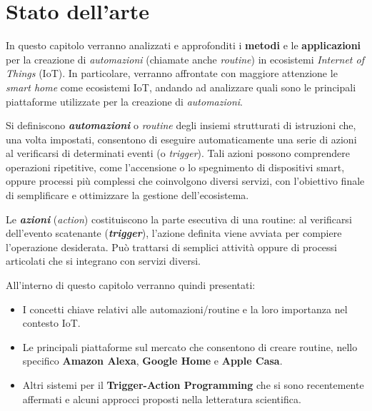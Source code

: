 
\chapter{Stato dell'arte}
In questo capitolo verranno analizzati e approfonditi i \textbf{metodi} e le \textbf{applicazioni} per la creazione di \emph{automazioni} (chiamate anche \emph{routine}) in ecosistemi \emph{Internet of Things} (IoT).
In particolare, verranno affrontate con maggiore attenzione le \emph{smart home} come ecosistemi IoT, andando ad analizzare quali sono le principali piattaforme utilizzate per la creazione di \textit{automazioni}.

Si definiscono \emph{\textbf{automazioni}} o \emph{routine} degli insiemi strutturati di istruzioni che, una volta impostati, consentono di eseguire automaticamente una serie di azioni al verificarsi di determinati eventi (o \emph{trigger}). Tali azioni possono comprendere operazioni ripetitive, come l'accensione o lo spegnimento di dispositivi smart, oppure processi più complessi che coinvolgono diversi servizi, con l'obiettivo finale di semplificare e ottimizzare la gestione dell'ecosistema.

Le \emph{\textbf{azioni}} (\emph{action}) costituiscono la parte esecutiva di una routine: al verificarsi dell’evento scatenante (\emph{\textbf{trigger}}), l’azione definita viene avviata per compiere l’operazione desiderata. Può trattarsi di semplici attività oppure di processi articolati che si integrano con servizi diversi.

All’interno di questo capitolo verranno quindi presentati:
\begin{itemize}
  \item I concetti chiave relativi alle automazioni/routine e la loro importanza nel contesto IoT.
  \item Le principali piattaforme sul mercato che consentono di creare routine, nello specifico \textbf{Amazon Alexa}, \textbf{Google Home} e \textbf{Apple Casa}.
  \item Altri sistemi per il \textbf{Trigger-Action Programming} che si sono recentemente affermati e alcuni approcci proposti nella letteratura scientifica.

\end{itemize}




